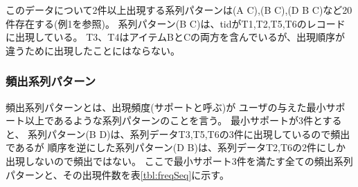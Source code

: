このデータについて2件以上出現する系列パターンは(A C),(B C),(D B C)など20件存在する(例1を参照)。
系列パターン(B C)は、tidがT1,T2,T5,T6のレコードに出現している。
T3、T4はアイテムBとCの両方を含んでいるが、出現順序が違うために出現したことにはならない。




\subsubsection*{頻出系列パターン}
頻出系列パターンとは、出現頻度(サポートと呼ぶ)が
ユーザの与えた最小サポート以上であるような系列パターンのことを言う。
最小サポートが3件とすると、
系列パターン(B D)は、系列データT3,T5,T6の3件に出現しているので頻出であるが
順序を逆にした系列パターン(D B)は、系列データT2,T6の2件にしか出現しないので頻出ではない。
ここで最小サポート3件を満たす全ての頻出系列パターンと、その出現件数を表\ref{tbl:freqSeq}に示す。

